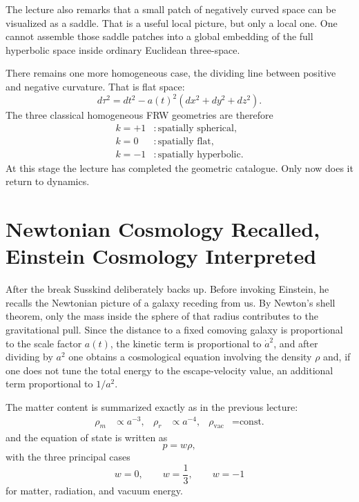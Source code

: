 The lecture also remarks that a small patch of negatively curved space can be visualized as a saddle. That is a useful local picture, but only a local one. One cannot assemble those saddle patches into a global embedding of the full hyperbolic space inside ordinary Euclidean three-space.

There remains one more homogeneous case, the dividing line between positive and negative curvature. That is flat space:
\begin{equation}
d\tau^2=dt^2-a(t)^2\left(dx^2+dy^2+dz^2\right).
\end{equation}
The three classical homogeneous FRW geometries are therefore
\begin{align}
k=+1 &: \text{spatially spherical}, \\
k=0 &: \text{spatially flat}, \\
k=-1 &: \text{spatially hyperbolic}.
\end{align}
At this stage the lecture has completed the geometric catalogue. Only now does it return to dynamics.

\section{Newtonian Cosmology Recalled, Einstein Cosmology Interpreted}

After the break Susskind deliberately backs up. Before invoking Einstein, he recalls the Newtonian picture of a galaxy receding from us. By Newton's shell theorem, only the mass inside the sphere of that radius contributes to the gravitational pull. Since the distance to a fixed comoving galaxy is proportional to the scale factor \(a(t)\), the kinetic term is proportional to \(\dot a^2\), and after dividing by \(a^2\) one obtains a cosmological equation involving the density \(\rho\) and, if one does not tune the total energy to the escape-velocity value, an additional term proportional to \(1/a^2\).

The matter content is summarized exactly as in the previous lecture:
\begin{align}
\rho_m &\propto a^{-3}, &
\rho_r &\propto a^{-4}, &
\rho_{\mathrm{vac}} &= \text{const.}
\end{align}
and the equation of state is written as
\begin{equation}
p=w\rho,
\end{equation}
with the three principal cases
\begin{equation}
w=0,\qquad w=\frac{1}{3},\qquad w=-1
\end{equation}
for matter, radiation, and vacuum energy.

